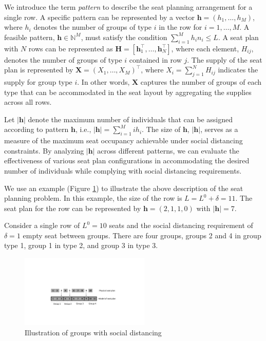We introduce the term \textit{pattern} to describe the seat planning arrangement for a single row. A specific pattern can be represented by a vector $\bm{h} = (h_1, \ldots, h_M)$, where $h_i$ denotes the number of groups of type $i$ in the row for $i = 1,\ldots, M$. A feasible pattern, $\bm{h} \in \mathbb{N}^{M}$, must satisfy the condition $\sum_{i=1}^{M} h_i n_i \leq L$. A seat plan with $N$ rows can be represented as $\bm{H} = [\bm{h}_{1}^{\intercal}, \ldots, \bm{h}_{N}^{\intercal}]$, where each element, $H_{ij}$, denotes the number of groups of type $i$ contained in row $j$. The supply of the seat plan is represented by $\bm{X} = (X_{1}, \ldots, X_{M})^{\intercal}$, where $X_i= \sum_{j=1}^{N} H_{ij}$ indicates the supply for group type $i$. In other words, $\bm{X}$ captures the number of groups of each type that can be accommodated in the seat layout by aggregating the supplies across all rows.

Let $|\bm{h}|$ denote the maximum number of individuals that can be assigned according to pattern $\bm{h}$, i.e., $|\bm{h}| = \sum_{i =1}^{M} i h_i$. The size of $\bm{h}$, $|\bm{h}|$, serves as a measure of the maximum seat occupancy achievable under social distancing constraints. By analyzing $|\bm{h}|$ across different patterns, we can evaluate the effectiveness of various seat plan configurations in accommodating the desired number of individuals while complying with social distancing requirements.

We use an example (Figure \ref{fex1}) to illustrate the above description of the seat planning problem. In this example, the size of the row is $L = L^{0} + \delta =11$. The seat plan for the row can be represented by $\bm{h} = (2,1,1,0)$ with $|\bm{h}| = 7$.

\begin{example}
Consider a single row of $L^0=10$ seats and the social distancing requirement of $\delta = 1$ empty seat between groups. There are four groups, groups 2 and 4 in group type 1, group 1 in type 2, and group 3 in type 3.
\end{example}

\begin{figure}[ht]
    \caption{Illustration of groups with social distancing}\label{fex1}
    \centering
        \includegraphics[width=0.55\textwidth]{./Figures/model_plan.pdf}
\end{figure}


